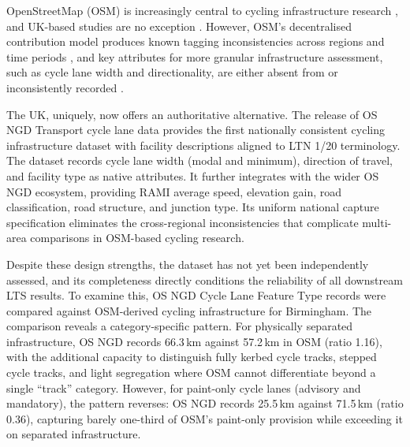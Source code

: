 OpenStreetMap (OSM) is increasingly central to cycling infrastructure research \parencite{ferster2020,nelson2021,vidal-tortosa2026}, and UK-based studies are no exception \parencite{yeboah2015,cervero2019,lovelace2020}. However, OSM's decentralised contribution model produces known tagging inconsistencies across regions and time periods \parencite{ferster2020,lukawska2026}, and key attributes for more granular infrastructure assessment, such as cycle lane width and directionality, are either absent from or inconsistently recorded \parencite{wasserman2019,lukawska2026}.

The UK, uniquely, now offers an authoritative alternative. The release of OS NGD Transport cycle lane data provides the first nationally consistent cycling infrastructure dataset with facility descriptions aligned to LTN 1/20 terminology. The dataset records cycle lane width (modal and minimum), direction of travel, and facility type as native attributes. It further integrates with the wider OS NGD ecosystem, providing RAMI average speed, elevation gain, road classification, road structure, and junction type. Its uniform national capture specification \parencite{ordnancesurvey2025} eliminates the cross-regional inconsistencies that complicate multi-area comparisons in OSM-based cycling research.

Despite these design strengths, the dataset has not yet been independently assessed, and its completeness directly conditions the reliability of all downstream LTS results. To examine this, OS NGD Cycle Lane Feature Type records were compared against OSM-derived cycling infrastructure for Birmingham. The comparison reveals a category-specific pattern. For physically separated infrastructure, OS NGD records 66.3\,km against 57.2\,km in OSM (ratio 1.16), with the additional capacity to distinguish fully kerbed cycle tracks, stepped cycle tracks, and light segregation where OSM cannot differentiate beyond a single ``track'' category. However, for paint-only cycle lanes (advisory and mandatory), the pattern reverses: OS NGD records 25.5\,km against 71.5\,km (ratio 0.36), capturing barely one-third of OSM's paint-only provision while exceeding it on separated infrastructure.

